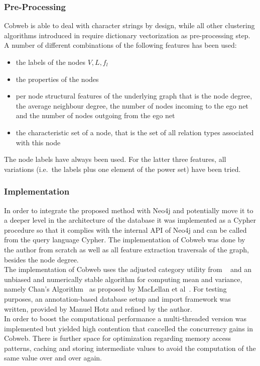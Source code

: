 \subsubsection{Pre-Processing}
Cobweb is able to deal with character strings by design, while all other clustering algorithms introduced in  require dictionary vectorization as pre-processing step.
  \noindent A number of different combinations of the following features has been used:
\begin{itemize}
    \item the labels of the nodes $V, L, f_l$ 
    \item the properties of the nodes
    \item per node structural features of the underlying graph that is the node degree, the average neighbour degree, the number of nodes incoming to the ego net and the number of nodes outgoing from the ego net
    \item the characteristic set of a node, that is the set of all relation types associated with this node 
\end{itemize}
The node labels have always been used. For the latter three features, all variations (i.e.~the labels plus one element of the power set) have been tried. \\
  
  \subsubsection{Implementation}
  In order to integrate the proposed method with Neo4j and potentially move it to a deeper level in the architecture of the database it was implemented as a Cypher procedure so that it complies with the internal API of Neo4j and can be called from the query language Cypher. The implementation of Cobweb was done by the author from scratch as well as all feature extraction traversals of the graph, besides the node degree. \\
The implementation of Cobweb uses the adjusted category utility from ~\cite{mckusick1990cobweb} and an unbiased and numerically stable algorithm for computing mean and variance, namely Chan's Algorithm~\cite{chansAlgo} as proposed by MacLellan et al~\cite{maclellan2016trestle}.
For testing purposes, an annotation-based database setup and import framework was written, provided by Manuel Hotz and refined by the author. \\
In order to boost the computational performance a multi-threaded version was implemented but yielded high contention that cancelled the concurrency gains in Cobweb. There is further space for optimization regarding memory access patterns, caching and storing intermediate values to avoid the computation of the same value over and over again. \\

